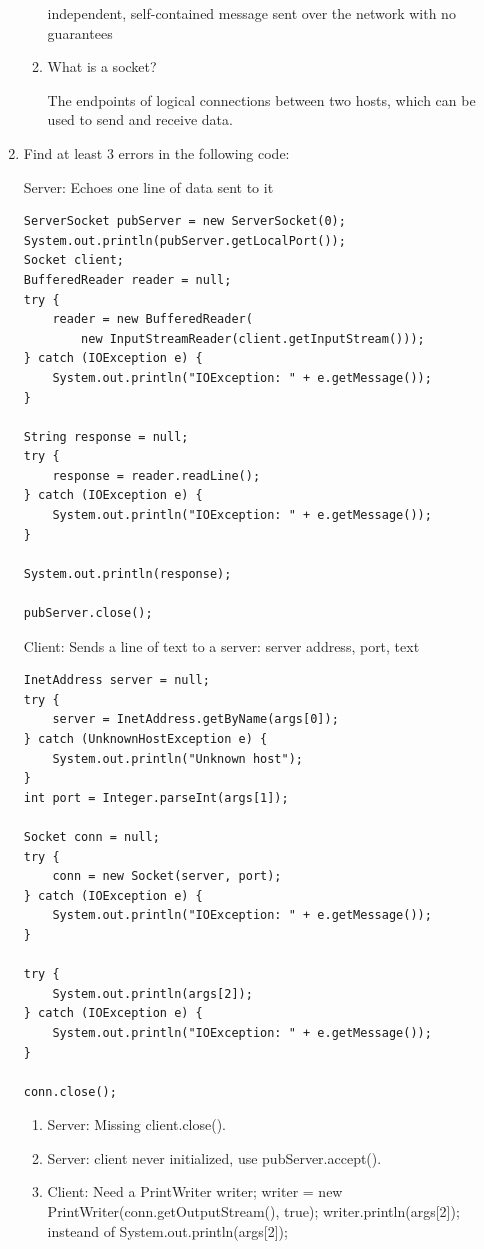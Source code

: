 \documentclass[11pt]{article}
\newenvironment{answer}{\large\lstset{basicstyle=\tiny\ttfamily}\color{white}}{}
\newenvironment{answer}{\large\lstset{basicstyle=\large\ttfamily}\color{red}}{}
\begin{document}
\begin{enumerate}
\begin{enumerate}
\begin{answer}
independent, self-contained message sent over the network with no guarantees
\end{answer}

\item What is a socket?

\begin{answer}
The endpoints of logical connections between two hosts, which can be used to send and receive data.
\end{answer}

\end{enumerate}

\item
	Find at least 3 errors in the following code:

	Server: Echoes one line of data sent to it

	\begin{lstlisting}
ServerSocket pubServer = new ServerSocket(0);
System.out.println(pubServer.getLocalPort());
Socket client;
BufferedReader reader = null;
try {
	reader = new BufferedReader(
		new InputStreamReader(client.getInputStream()));
} catch (IOException e) {
	System.out.println("IOException: " + e.getMessage());
}

String response = null;
try {
	response = reader.readLine();
} catch (IOException e) {
	System.out.println("IOException: " + e.getMessage());
}

System.out.println(response);

pubServer.close();
	\end{lstlisting}

	Client: Sends a line of text to a server: server address, port, text

	\begin{lstlisting}
InetAddress server = null;
try {
	server = InetAddress.getByName(args[0]);
} catch (UnknownHostException e) {
	System.out.println("Unknown host");
}
int port = Integer.parseInt(args[1]);

Socket conn = null;
try {
	conn = new Socket(server, port);
} catch (IOException e) {
	System.out.println("IOException: " + e.getMessage());
}

try {
	System.out.println(args[2]);
} catch (IOException e) {
	System.out.println("IOException: " + e.getMessage());
}

conn.close();
	\end{lstlisting}

	\begin{answer}
		\begin{enumerate}
		\item
			Server: Missing client.close().
		\item
			Server: client never initialized, use pubServer.accept().	
		\item
			Client: Need a PrintWriter writer; writer = new PrintWriter(conn.getOutputStream(), true); writer.println(args[2]); insteand of System.out.println(args[2]);
		\end{enumerate}
	\end{answer}

\end{enumerate}
\end{document}
